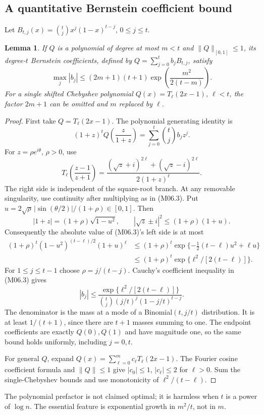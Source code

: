 \documentclass[11pt,a4paper]{article}
\newtheorem{lemma}[theorem]{Lemma}
\theoremstyle{definition}\newtheorem{definition}[theorem]{Definition}
\theoremstyle{remark}\newtheorem{remark}[theorem]{Remark}
\numberwithin{equation}{section}
\begin{document}
\subsection{A quantitative Bernstein coefficient bound}\label{M06-sec-2}
Let $B_{t,j}(x)=\binom{t}{j}x^j(1-x)^{t-j}$, $0\le j\le t$.
\begin{lemma}\label{M06-lem:bernstein}
If $Q$ is a polynomial of degree at most $m<t$ and $\|Q\|_{[0,1]}\le1$, its degree-$t$ Bernstein coefficients, defined by $Q=\sum_{j=0}^t b_jB_{t,j}$, satisfy
\[
 \max_j|b_j|\le(2m+1)(t+1)
      \exp\left(\frac{m^2}{2(t-m)}\right).\tag{M06.2}
\]
For a single shifted Chebyshev polynomial $Q(x)=T_\ell(2x-1)$, $\ell<t$, the factor $2m+1$ can be omitted and $m$ replaced by $\ell$.
\end{lemma}
\begin{proof}
First take $Q=T_\ell(2x-1)$. The polynomial generating identity is
\[
 (1+z)^tQ\left(\frac z{1+z}\right)
 =\sum_{j=0}^t\binom{t}{j}b_jz^j.\tag{M06.3}
\]
For $z=\rho e^{i\theta}$, $\rho>0$, use
\[
 T_\ell\left(\frac{z-1}{z+1}\right)
 =\frac{(\sqrt z+i)^{2\ell}+(\sqrt z-i)^{2\ell}}
          {2(1+z)^\ell}.
\]
The right side is independent of the square-root branch. At any removable singularity, use continuity after multiplying as in (M06.3). Put
$u=2\sqrt\rho\,|\sin(\theta/2)|/(1+\rho)\in[0,1]$.
Then
\[
 |1+z|=(1+\rho)\sqrt{1-u^2},\qquad
 |\sqrt z\pm i|^2\le(1+\rho)(1+u).
\]
Consequently the absolute value of (M06.3)'s left side is at most
\begin{align*}
 (1+\rho)^t(1-u^2)^{(t-\ell)/2}(1+u)^\ell
 &\le(1+\rho)^t\exp\{-\tfrac12(t-\ell)u^2+\ell u\}\\
 &\le(1+\rho)^t\exp\{\ell^2/[2(t-\ell)]\}.
\end{align*}
For $1\le j\le t-1$ choose $\rho=j/(t-j)$. Cauchy's coefficient inequality in (M06.3) gives
\[
 |b_j|\le\frac{\exp\{\ell^2/[2(t-\ell)]\}}
 {\binom{t}{j}(j/t)^j(1-j/t)^{t-j}}.
\]
The denominator is the mass at a mode of a Binomial$(t,j/t)$ distribution. It is at least $1/(t+1)$, since there are $t+1$ masses summing to one. The endpoint coefficients are exactly $Q(0),Q(1)$ and have magnitude one, so the same bound holds uniformly, including $j=0,t$.

For general $Q$, expand $Q(x)=\sum_{\ell=0}^m c_\ell T_\ell(2x-1)$. The Fourier cosine coefficient formula and $\|Q\|\le1$ give $|c_0|\le1$, $|c_\ell|\le2$ for $\ell>0$. Sum the single-Chebyshev bounds and use monotonicity of $\ell^2/(t-\ell)$.
\end{proof}
The polynomial prefactor is not claimed optimal; it is harmless when $t$ is a power of $\log n$. The essential feature is exponential growth in $m^2/t$, not in $m$.
\end{document}
